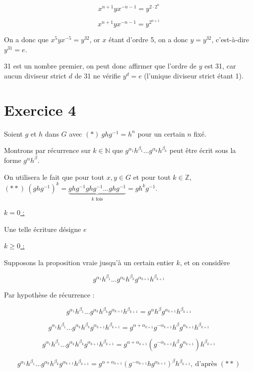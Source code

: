 \documentclass[]{article}
\theoremstyle{remark}
\theoremstyle{definition}
\begin{document}
	$$x^{n+1} y x^{-n-1} = y^{2 \cdot 2^n}$$

	$$x^{n+1} y x^{-n-1} = y^{2^{n+1}}$$

On a donc que $x^5 y x^{-5} = y^{32}$, or $x$ étant d'ordre 5, on a donc $y = y^{32}$, c'est-à-dire $y^{31} = e$.

31 est un nombre premier, on peut donc affirmer que l'ordre de $y$ est 31, car aucun diviseur strict $d$ de 31 ne vérifie $y^d = e$ (l'unique diviseur strict étant 1).

\section*{Exercice 4}

Soient $g$ et $h$ dans $G$ avec $(*) ~ ghg^{-1}=h^n$ pour un certain $n$ fixé.

Montrons par récurrence sur $k \in \mathbb{N}$ que $g^{\alpha_1} h^{\beta_1} ... g^{\alpha_k} h^{\beta_k}$ peut être écrit sous la forme $g^{\alpha} h^{\beta}$.

On utilisera le fait que pour tout $x, y \in G$ et pour tout $k \in \mathbb{Z}$, $(**) ~ \left(ghg^{-1}\right)^k = \underbrace{ghg^{-1} ghg^{-1} ... ghg^{-1}}_{k \text{ fois}} = g h^k g^{-1}$.

\underline{$k = 0$ :}

Une telle écriture désigne $e$

\underline{$k \geqslant 0$ :}

Supposons la proposition vraie jusqu'à un certain entier $k$, et on considère

$$g^{\alpha_1} h^{\beta_1} ... g^{\alpha_k} h^{\beta_k} g^{\alpha_{k+1}} h^{\beta_{k+1}}$$

Par hypothèse de récurrence :

$$g^{\alpha_1} h^{\beta_1} ... g^{\alpha_k} h^{\beta_k} g^{\alpha_{k+1}} h^{\beta_{k+1}} = g^\alpha h^\beta g^{\alpha_{k+1}} h^{\beta_{k+1}}$$

$$g^{\alpha_1} h^{\beta_1} ... g^{\alpha_k} h^{\beta_k} g^{\alpha_{k+1}} h^{\beta_{k+1}} = g^{\alpha + \alpha_{k+1}} g^{-\alpha_{k+1}} h^\beta g^{\alpha_{k+1}} h^{\beta_{k+1}}$$

$$g^{\alpha_1} h^{\beta_1} ... g^{\alpha_k} h^{\beta_k} g^{\alpha_{k+1}} h^{\beta_{k+1}} = g^{\alpha + \alpha_{k+1}} \left(g^{-\alpha_{k+1}} h^\beta g^{\alpha_{k+1}}\right) h^{\beta_{k+1}}$$

$$g^{\alpha_1} h^{\beta_1} ... g^{\alpha_k} h^{\beta_k} g^{\alpha_{k+1}} h^{\beta_{k+1}} = g^{\alpha + \alpha_{k+1}} \left(g^{-\alpha_{k+1}} h g^{\alpha_{k+1}}\right)^\beta h^{\beta_{k+1}}, ~ \text{d'après } (**)$$
\end{document}
